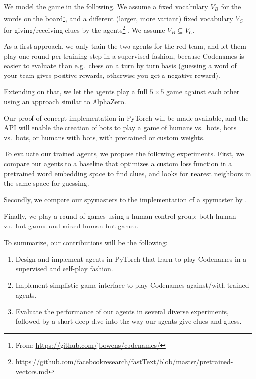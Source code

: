 \documentclass{article}
\begin{document}
We model the game in the following. We assume a fixed vocabulary $V_B$ for the words on the board\footnote{From: \url{https://github.com/jbowens/codenames/}}, and a different (larger, more variant) fixed vocabulary $V_C$ for giving/receiving clues by the agents\footnote{\url{https://github.com/facebookresearch/fastText/blob/master/pretrained-vectors.md}} \cite{fasttext}. We assume $V_B \subseteq V_C$.

As a first approach, we only train the two agents for the red team, and let them play one round per training step in a supervised fashion, because Codenames is easier to evaluate than e.g.~chess on a turn by turn basis (guessing a word of your team gives positive rewards, otherwise you get a negative reward).

Extending on that, we let the agents play a full $5 \times 5$ game against each other using an approach similar to AlphaZero\cite{alphazero}.

Our proof of concept implementation in PyTorch will be made available, and the API will enable the creation of bots to play a game of humans vs.~bots, bots vs.~bots, or humans with bots, with pretrained or custom weights.

To evaluate our trained agents, we propose the following experiments. First, we compare our agents to a baseline that optimizes a custom loss function in a pretrained word embedding space to find clues, and looks for nearest neighbors in the same space for guessing.

Secondly, we compare our spymasters to the implementation of a spymaster by \cite{codenamesai}.

Finally, we play a round of games using a human control group: both human vs.~bot games and mixed human-bot games.

To summarize, our contributions will be the following:
\begin{enumerate}
    \item Design and implement agents in PyTorch that learn to play Codenames in a supervised and self-play fashion.
    \item Implement simplistic game interface to play Codenames against/with trained agents.
    \item Evaluate the performance of our agents in several diverse experiments, followed by a short deep-dive into the way our agents give clues and guess.
\end{enumerate}
\end{document}
